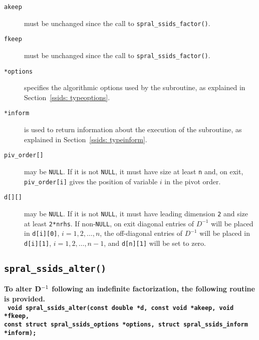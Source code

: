 \begin{description}

\item[\texttt{akeep}] must be unchanged since the call to
   {\tt spral\_ssids\_factor()}.

\item[\texttt{fkeep}] must be unchanged since the call to
   {\tt spral\_ssids\_factor()}.

\item[\texttt{*options}] specifies the algorithmic options used by the
   subroutine, as explained in Section~\ref{ssids: typeoptions}.

\item[\texttt{*inform}] is used to return information about the execution
   of the subroutine, as explained in Section~\ref{ssids: typeinform}.

\item[\texttt{piv\_order[]}] may be \texttt{NULL}. If it is not \texttt{NULL},
   it must have size at least {\tt n} and, on exit, \texttt{piv\_order[i]}
   gives the position of variable $i$ in the pivot order.

\item[\texttt{d[][]}] may be \texttt{NULL}. If it is not \texttt{NULL},
   it must have leading dimension \texttt{2} and size at least \texttt{2*nrhs}.
   If non-\texttt{NULL}, on exit diagonal entries of ${D}^{-1}$ will be placed
   in {\tt d[i][0]}, $i = 1,2,\ldots,n$, the off-diagonal entries of ${D}^{-1}$
   will be placed in {\tt d[i][1]}, $i = 1,2,\ldots,n-1$, and {\tt d[n][1]}
   will be set to zero.

\end{description}



\subsection{\texttt{spral\_ssids\_alter()}}
\textbf{To alter ${\bf D}^{-1}$ following an indefinite factorization,
   the following routine is provided.
   \vspace*{0.1cm} \\
   \texttt{
      \hspace*{0.2cm} void spral\_ssids\_alter(const double *d, const void *akeep, void *fkeep, \\
      \hspace*{0.7cm} const struct spral\_ssids\_options *options,
         struct spral\_ssids\_inform *inform);
   }
}

